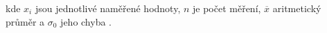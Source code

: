 \documentclass[english]{article}
\begin{document}
	kde $ x_i $ jsou jednotlivé naměřené hodnoty, $ n $ je počet měření, $ \overline{x} $ aritmetický průměr a $ \sigma_0 $ jeho chyba \cite{bib:chyby}.
%	
%	
%	
%	
%	 
%	
%	 
%
\end{document}
